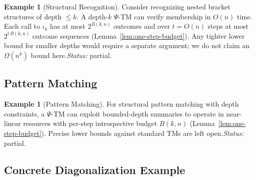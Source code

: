 \documentclass[11pt]{article}
\theoremstyle{definition}
\newtheorem{example}[theorem]{Example}
\newcommand{\PSi}{\Psi}
\begin{document}
\begin{example}[Structural Recognition]
Consider recognizing nested bracket structures of depth $\leq k$. A depth-$k$ $\PSi$-TM can verify membership in $O(n)$ time. Each call to $\iota_k$ has at most $2^{B(k,n)}$ outcomes and over $t=O(n)$ steps at most $2^{t\,B(k,n)}$ outcome sequences (Lemma~\ref{lem:one-step-budget}). Any tighter lower bound for smaller depths would require a separate argument; we do not claim an $\Omega(n^k)$ bound here.\;\emph{Status:} partial.
\end{example}

\subsection{Pattern Matching}

\begin{example}[Pattern Matching]
For structural pattern matching with depth constraints, a $\PSi$-TM can exploit bounded-depth summaries to operate in near-linear resources with per-step introspective budget $B(k,n)$ (Lemma~\ref{lem:one-step-budget}). Precise lower bounds against standard TMs are left open.\;\emph{Status:} partial.
\end{example}

\subsection{Concrete Diagonalization Example}
\end{document}
